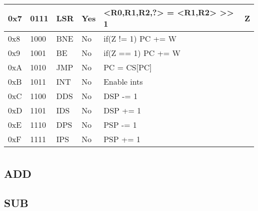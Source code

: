 \documentclass[a4paper]{article}
\begin{document}
\begin{table}[]
\begin{tabular}{|l|l|l|l|l|l|}
        0x7                 &   0111            &   LSR                 &   Yes                 &   <R0,R1,R2,?> = <R1,R2> >> 1             &   Z                       \\ \hline  
        0x8                 &   1000            &   BNE                 &   No                  &   if(Z != 1) PC += W                      &                           \\ \hline  
        0x9                 &   1001            &   BE                  &   No                  &   if(Z == 1) PC += W                      &                           \\ \hline  
        0xA                 &   1010            &   JMP                 &   No                  &   PC = CS[PC]                             &                           \\ \hline  
        0xB                 &   1011            &   INT                 &   No                  &   Enable ints                             &                           \\ \hline  
        0xC                 &   1100            &   DDS                 &   No                  &   DSP -= 1                                &                           \\ \hline  
        0xD                 &   1101            &   IDS                 &   No                  &   DSP += 1                                &                           \\ \hline  
        0xE                 &   1110            &   DPS                 &   No                  &   PSP -= 1                                &                           \\ \hline  
        0xF                 &   1111            &   IPS                 &   No                  &   PSP += 1                                &                           \\ \hline  
    \end{tabular}
\end{table}


\section{}

\subsection{ADD}

\subsection{SUB}
\end{document}
